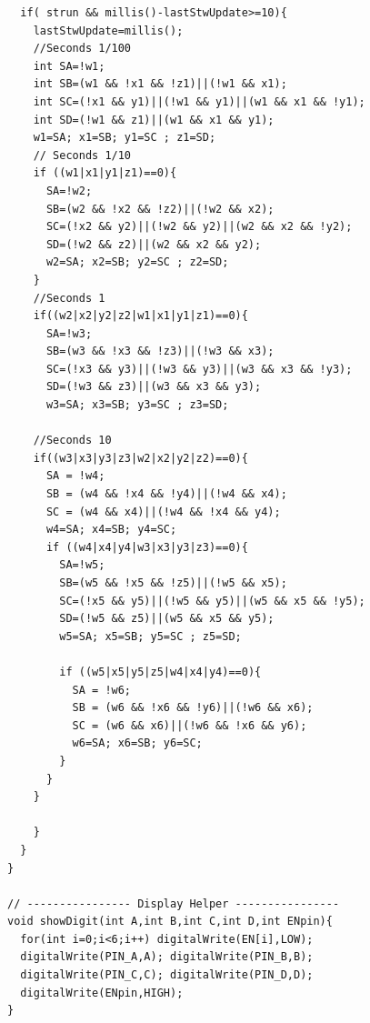 \documentclass{report}
\begin{document}
\begin{verbatim}
  if( strun && millis()-lastStwUpdate>=10){
    lastStwUpdate=millis();
    //Seconds 1/100
    int SA=!w1;
    int SB=(w1 && !x1 && !z1)||(!w1 && x1);
    int SC=(!x1 && y1)||(!w1 && y1)||(w1 && x1 && !y1);
    int SD=(!w1 && z1)||(w1 && x1 && y1);
    w1=SA; x1=SB; y1=SC ; z1=SD;
    // Seconds 1/10
    if ((w1|x1|y1|z1)==0){
      SA=!w2;
      SB=(w2 && !x2 && !z2)||(!w2 && x2);
      SC=(!x2 && y2)||(!w2 && y2)||(w2 && x2 && !y2);
      SD=(!w2 && z2)||(w2 && x2 && y2);
      w2=SA; x2=SB; y2=SC ; z2=SD; 
    }
    //Seconds 1
    if((w2|x2|y2|z2|w1|x1|y1|z1)==0){
      SA=!w3;
      SB=(w3 && !x3 && !z3)||(!w3 && x3);
      SC=(!x3 && y3)||(!w3 && y3)||(w3 && x3 && !y3);
      SD=(!w3 && z3)||(w3 && x3 && y3);
      w3=SA; x3=SB; y3=SC ; z3=SD; 
    
    //Seconds 10
    if((w3|x3|y3|z3|w2|x2|y2|z2)==0){
      SA = !w4;
      SB = (w4 && !x4 && !y4)||(!w4 && x4);
      SC = (w4 && x4)||(!w4 && !x4 && y4);
      w4=SA; x4=SB; y4=SC; 
      if ((w4|x4|y4|w3|x3|y3|z3)==0){
        SA=!w5;
        SB=(w5 && !x5 && !z5)||(!w5 && x5);
        SC=(!x5 && y5)||(!w5 && y5)||(w5 && x5 && !y5);
        SD=(!w5 && z5)||(w5 && x5 && y5);
        w5=SA; x5=SB; y5=SC ; z5=SD;
      
        if ((w5|x5|y5|z5|w4|x4|y4)==0){
          SA = !w6;
          SB = (w6 && !x6 && !y6)||(!w6 && x6);
          SC = (w6 && x6)||(!w6 && !x6 && y6);
          w6=SA; x6=SB; y6=SC;   
        }
      }
    } 
    
    }    
  }
}

// ---------------- Display Helper ----------------
void showDigit(int A,int B,int C,int D,int ENpin){
  for(int i=0;i<6;i++) digitalWrite(EN[i],LOW);
  digitalWrite(PIN_A,A); digitalWrite(PIN_B,B);
  digitalWrite(PIN_C,C); digitalWrite(PIN_D,D);
  digitalWrite(ENpin,HIGH);
}
\end{verbatim}
\end{document}
